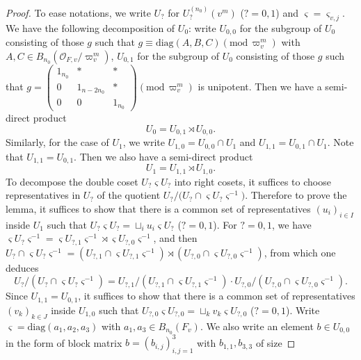 \documentclass[12pt,oneside,reqno]{amsart}
\theoremstyle{plain}
\begin{document}
	\begin{proof}
		To ease notations,
		we write
		$U_?$
		for $U_?^{(n_0)}(v^m)$
		($?=0,1$)
		and
		$\varsigma=\varsigma_{v,j}$.
		We have the following decomposition of
		$U_0$:
		write
		$U_{0,0}$
		for the subgroup of
		$U_0$
		consisting of those $g$ such that
		$g
		\equiv
		\mathrm{diag}
		(A,B,C)(\mathrm{mod}\,\varpi_v^m)$
		with $A,C\in
		B_{n_0}
		(\mathcal{O}_{F,v}/\varpi_v^m)$,
		$U_{0,1}$
		for the subgroup of
		$U_0$
		consisting of those 
		$g$ such that
		$g
		=
		\begin{pmatrix}
			1_{n_0} & \ast & \ast \\
			0 & 1_{n-2n_0} & \ast \\
			0 & 0 & 1_{n_0}
		\end{pmatrix}
		(\mathrm{mod}\,\varpi_v^m)$
		is unipotent.
		Then we have
		a semi-direct product
		\[
		U_0
		=
		U_{0,1}\rtimes U_{0,0}.
		\]
		Similarly, for the case of
		$U_1$,
		we write
		$U_{1,0}
		=
		U_{0,0}\cap
		U_1$
		and
		$U_{1,1}
		=
		U_{0,1}\cap
		U_1$.
		Note that $U_{1,1}=U_{0,1}$.
		Then we also have a semi-direct product
		\[
		U_1
		=
		U_{1,1}\rtimes U_{1,0}.
		\]
		To decompose the double coset
		$U_?
		\varsigma
		U_?$
		into right cosets,
		it suffices to choose representatives in
		$U_?$
		of the quotient
		$U_?/
		\big(
		U_?
		\cap
		\varsigma
		U_?\varsigma^{-1}
		\big)$.
		Therefore to prove the lemma,
		it suffices to show that
		there is a common set of representatives
		$(u_i)_{i\in I}$ inside
		$U_1$
		such that
		$U_?\varsigma U_?=
		\sqcup_iu_i\varsigma U_?$
		($?=0,1$).
		For $?=0,1$,
		we have
		$\varsigma
		U_?
		\varsigma^{-1}
		=
		\varsigma U_{?,1}\varsigma^{-1}
		\rtimes
		\varsigma U_{?,0}\varsigma^{-1}$,
		and then
		$U_?\cap
		\varsigma U_?\varsigma^{-1}
		=
		(
		U_{?,1}\cap
		\varsigma
		U_{?,1}\varsigma^{-1}
		)
		\rtimes
		(
		U_{?,0}\cap
		\varsigma
		U_{?,0}
		\varsigma^{-1}
		)$,
		from which one deduces
		\[
		U_?/
		(U_?\cap
		\varsigma U_?\varsigma^{-1})
		=
		U_{?,1}/
		(U_{?,1}\cap
		\varsigma
		U_{?,1}\varsigma^{-1})
		\cdot
		U_{?,0}/
		(U_{?,0}\cap
		\varsigma
		U_{?,0}
		\varsigma^{-1}).
		\]
		Since
		$U_{1,1}=U_{0,1}$,
		it suffices to show that there is a common set of
		representatives
		$(v_k)_{k\in J}$
		inside
		$U_{1,0}$
		such that
		$U_{?,0}\varsigma U_{?,0}
		=
		\sqcup_kv_k\varsigma U_{?,0}$
		($?=0,1$).
		Write
		$\varsigma=
		\mathrm{diag}(a_1,a_2,a_3)$
		with
		$a_1,a_3\in
		B_{n_0}
		(F_v)$.
		We also write an element
		$b\in
		U_{0,0}$
		in the form of block matrix
		$b=(b_{i,j})_{i,j=1}^3$
		with
		$b_{1,1},b_{3,3}$ of size

\end{proof}
\end{document}
